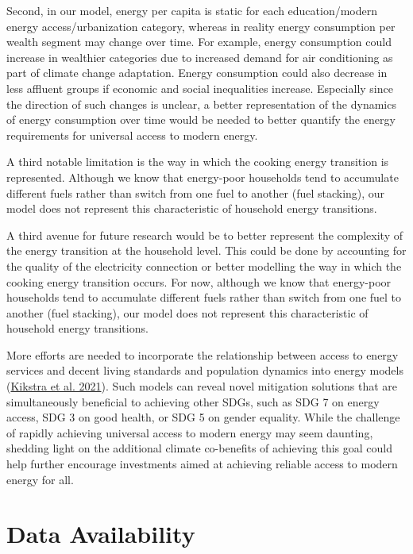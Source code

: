 \documentclass[
]{article}
\begin{document}
Second, in our model, energy per capita is static for each education/modern energy access/urbanization category, whereas in reality energy consumption per wealth segment may change over time. For example, energy consumption could increase in wealthier categories due to increased demand for air conditioning as part of climate change adaptation. Energy consumption could also decrease in less affluent groups if economic and social inequalities increase. Especially since the direction of such changes is unclear, a better representation of the dynamics of energy consumption over time would be needed to better quantify the energy requirements for universal access to modern energy.

A third notable limitation is the way in which the cooking energy transition is represented. Although we know that energy-poor households tend to accumulate different fuels rather than switch from one fuel to another (fuel stacking), our model does not represent this characteristic of household energy transitions.

A third avenue for future research would be to better represent the complexity of the energy transition at the household level. This could be done by accounting for the quality of the electricity connection or better modelling the way in which the cooking energy transition occurs. For now, although we know that energy-poor households tend to accumulate different fuels rather than switch from one fuel to another (fuel stacking), our model does not represent this characteristic of household energy transitions.

More efforts are needed to incorporate the relationship between access to energy services and decent living standards and population dynamics into energy models (\protect\hyperlink{ref-kikstra_decent_2021}{Kikstra et al. 2021}). Such models can reveal novel mitigation solutions that are simultaneously beneficial to achieving other SDGs, such as SDG 7 on energy access, SDG 3 on good health, or SDG 5 on gender equality. While the challenge of rapidly achieving universal access to modern energy may seem daunting, shedding light on the additional climate co-benefits of achieving this goal could help further encourage investments aimed at achieving reliable access to modern energy for all.

\hypertarget{data-availability}{%
\section*{Data Availability}\label{data-availability}}
\end{document}
